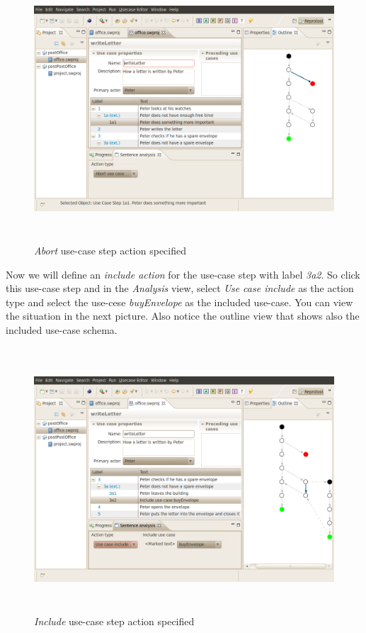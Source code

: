 \newpage

\begin{figure}[ht]
  \centering
  \includegraphics[height=280pt]{images/reprotoolAbort}
  \caption{\emph{Abort} use-case step action specified}
  \label{fig:reprotoolAbort}
\end{figure}

\newpage

Now we will define an \emph{include action} for the use-case step with label \emph{3a2}. So click this use-case step and in the
\emph{Analysis} view, select \emph{Use case include} as the action type and select the use-cese \emph{buyEnvelope} as the included
use-case. You can view the situation in the next picture. Also notice the outline view that shows also the included use-case schema. 

\begin{figure}[ht]
  \centering
  \includegraphics[height=280pt]{images/reprotoolInclude}
  \caption{\emph{Include} use-case step action specified}
  \label{fig:reprotoolInclude}
\end{figure}

